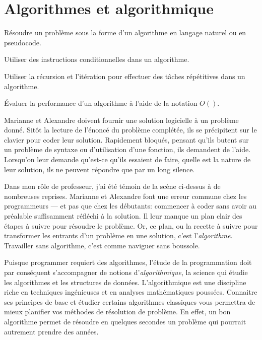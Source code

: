 
\chapter{Algorithmes et algorithmique}
\label{chap:algorithmes}

\def\scriptfilename{\currfilebase.R}

\begin{objectifs}
\item Résoudre un problème sous la forme d'un algorithme en langage
  naturel ou en pseudocode.
\item Utiliser des instructions conditionnelles dans un algorithme.
\item Utiliser la récursion et l'itération pour effectuer des tâches
  répétitives dans un algorithme.
\item Évaluer la performance d'un algorithme à l'aide de la notation
  $O()$.
\end{objectifs}

Marianne et Alexandre doivent fournir une solution logicielle à un
problème donné. Sitôt la lecture de l'énoncé du problème complétée,
ils se précipitent sur le clavier pour coder leur solution. Rapidement
bloqués, pensant qu'ils butent sur un problème de syntaxe ou
d'utilisation d'une fonction, ils demandent de l'aide. Lorsqu'on leur
demande qu'est-ce qu'ils essaient de faire, quelle est la nature de leur
solution, ils ne peuvent répondre que par un long silence.

Dans mon rôle de professeur, j'ai été témoin de la scène ci-dessus à
de nombreuses reprises. Marianne et Alexandre font une erreur commune
chez les programmeurs --- et pas que chez les débutants: commencer à
coder sans avoir au préalable suffisamment réfléchi à la solution. Il
leur manque un plan clair des étapes à suivre pour résoudre le
problème. Or, ce plan, ou la recette à suivre pour transformer les
entrants d'un problème en une solution, c'est
l'\emph{algorithme}. Travailler sans algorithme,
c'est comme naviguer sans boussole.

Puisque programmer requiert des algorithmes, l'étude de la
programmation doit par conséquent s'accompagner de notions
d'\emph{algorithmique}, la science qui étudie les
algorithmes et les structures de données. L'algorithmique est une
discipline riche en techniques ingénieuses et en analyses
mathématiques poussées. Connaitre ses principes de base et étudier
certains algorithmes classiques vous permettra de mieux planifier vos
méthodes de résolution de problème. En effet, un bon algorithme permet
de résoudre en quelques secondes un problème qui pourrait autrement
prendre des années.

